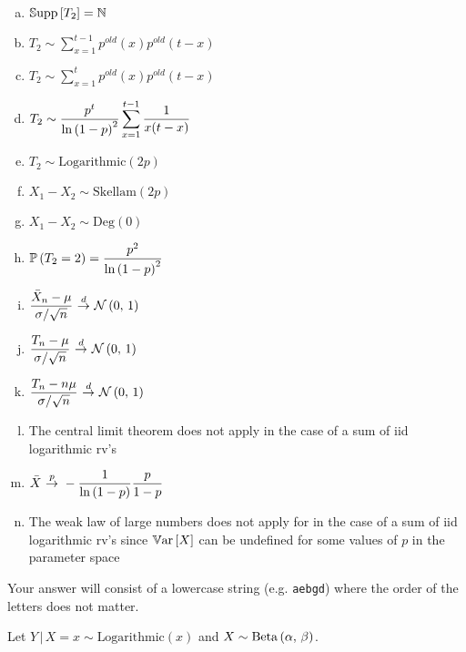 \documentclass[12pt,landscape]{article}
\newcommand{\instr}{\small Your answer will consist of a lowercase string (e.g. \texttt{aebgd}) where the order of the letters does not matter. \normalsize}
\begin{document}
\benum{} 

\begin{multicols}{2}
\begin{enumerate}[(a)]
\item $\mathbb{S}\text{upp}\left[T_2\right] = \mathbb{N}$
\item $T_2 \sim \displaystyle \sum_{x=1}^{t-1} p^{old}(x) p^{old}(t - x)$
\item $T_2 \sim \displaystyle \sum_{x=1}^{t} p^{old}(x) p^{old}(t - x)$
\item $T_2 \sim \displaystyle\frac{p^t}{\ln\left(1-p\right)^2}  \sum_{x=1}^{t-1} \frac{1}{x(t-x)}$
\item $T_2 \sim \text{Logarithmic}(2p)$
\item $X_1 - X_2 \sim \text{Skellam}(2p)$
\item $X_1 - X_2 \sim \text{Deg}(0)$
\item $\mathbb{P}\left(T_2 = 2\right) = \displaystyle\frac{p^2}{\ln\left(1-p\right)^2} $
\item $\displaystyle \frac{\Xbar_n - \mu}{\sigma / \sqrt{n}} \convd \stdnormnot$
\item $\displaystyle \frac{T_n - \mu}{\sigma / \sqrt{n}} \convd \stdnormnot$
\item $\displaystyle \frac{T_n - n\mu}{\sigma / \sqrt{n}} \convd \stdnormnot$
\item The central limit theorem does not apply in the case of a sum of iid logarithmic rv's
\item $\Xbar \convp -\displaystyle\oneover{\natlog{1-p}}\frac{p}{1-p}$
\item The weak law of large numbers does not apply for in the case of a sum of iid logarithmic rv's since $\mathbb{V}\text{ar}\left[X\right]$ can be undefined for some values of $p$ in the parameter space
\end{enumerate}
\end{multicols}
\eenum\instr\pagebreak


\problem{}  Let $Y\,|\,X = x \sim \text{Logarithmic}(x)$ and $X \sim \mathrm{Beta}\left(\alpha,\,\beta\right)$.
\end{document}
